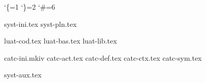 

\catcode`\{=1 \catcode`\}=2 \catcode`\#=6

\edef\metatexformat {\jobname}
\edef\metatexversion{2007.04.03 13:01}

\let\fmtname   \metatexformat
\let\fmtversion\metatexversion

\ifx\normalinput\undefined \let\normalinput \fi

\def\loadcorefile#1{\normalinput#1\relax}

\loadcorefile{syst-ini.tex}  %
\loadcorefile{syst-pln.tex}  %

\loadcorefile{luat-cod.tex}  %
\loadcorefile{luat-bas.tex}  %
\loadcorefile{luat-lib.tex}  %


\loadcorefile{catc-ini.mkiv} %
\loadcorefile{catc-act.tex}  %
\loadcorefile{catc-def.tex}  %
\loadcorefile{catc-ctx.tex}  %
\loadcorefile{catc-sym.tex}  %


\loadcorefile{syst-aux.tex}  %

